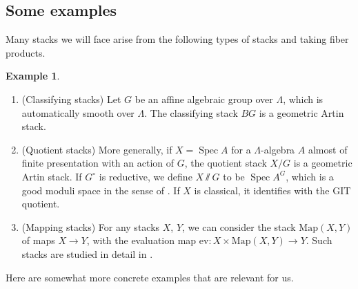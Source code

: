 \documentclass{amsart}
\theoremstyle{definition}
\newtheorem{example}[theorem]{Example}
\theoremstyle{remark}
\numberwithin{equation}{section}
\DeclareMathOperator{\Spec}{Spec}
\newcommand{\Map}{\mathrm{Map}}
\newcommand{\ev}{\mathrm{ev}}
\begin{document}
\subsection{Some examples}
Many stacks we will face arise from the following types of stacks and taking fiber products. 

\begin{example}
\begin{enumerate}
    \item (Classifying stacks) Let $G$ be an affine algebraic group over $\Lambda$, which is automatically smooth over $\Lambda$. The classifying stack $BG$ is a geometric Artin stack.
    \item (Quotient stacks) More generally, if $X=\Spec A$ for a $\Lambda$-algebra $A$ almost of finite presentation with an action of $G$, the quotient stack $X/G$ is a geometric Artin stack. If $G^{\circ}$ is reductive, we define $X\sslash G$ to be $\Spec A^G$, which is a good moduli space in the sense of \cite{GoodModuli}. If $X$ is classical, it identifies with the GIT quotient.
    \item (Mapping stacks) For any stacks $X$, $Y$, we can consider the stack $\Map(X, Y)$ of maps $X\to Y$, with the evaluation map $\ev\colon X\times \Map(X,Y)\to Y$. Such stacks are studied in detail in \cite{HalpernLeistnerPreygel}. 
\end{enumerate}    
\end{example}

Here are somewhat more concrete examples that are relevant for us. 
\end{document}
